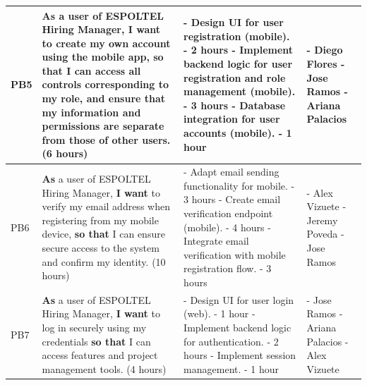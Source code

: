 \documentclass{scrreprt}
\begin{document}
\begin{longtable}{|p{1.5cm}|p{5.5cm}|p{4.5cm}|p{3cm}|}
	PB5 & \textbf{As} a user of ESPOLTEL Hiring Manager, \textbf{I want} to create my own account using the mobile app, \textbf{so that} I can access all controls corresponding to my role, and ensure that my information and permissions are separate from those of other users. (6 hours) & 
	- Design UI for user registration (mobile). - 2 hours \newline
	- Implement backend logic for user registration and role management (mobile). - 3 hours \newline
	- Database integration for user accounts (mobile). - 1 hour
	&
	- Diego Flores \newline
	- Jose Ramos \newline
	- Ariana Palacios
	\\ \hline
	
	PB6 & \textbf{As} a user of ESPOLTEL Hiring Manager, \textbf{I want} to verify my email address when registering from my mobile device, \textbf{so that} I can ensure secure access to the system and confirm my identity. (10 hours) & 
	- Adapt email sending functionality for mobile. - 3 hours \newline
	- Create email verification endpoint (mobile). - 4 hours \newline
	- Integrate email verification with mobile registration flow. - 3 hours
	&
	- Alex Vizuete \newline
	- Jeremy Poveda \newline
	- Jose Ramos
	\\ \hline
	
	PB7 & \textbf{As} a user of ESPOLTEL Hiring Manager, \textbf{I want} to log in securely using my credentials \textbf{so that} I can access features and project management tools. (4 hours)& 
- Design UI for user login (web). - 1 hour \newline
- Implement backend logic for authentication. - 2 hours \newline
- Implement session management. - 1 hour
&
- Jose Ramos \newline
- Ariana Palacios \newline
- Alex Vizuete
\\ \hline


\end{longtable}
\end{document}
